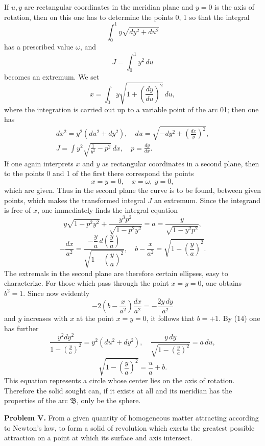 \documentclass[11pt,a4paper,leqno]{article}
\begin{document}
If $u,y$ are rectangular coordinates in the meridian plane and $y=0$ is the axis of rotation, then on this one has to determine the points 0, 1 so that the integral
\[
\int_0^1 y\sqrt{dy^2+du^2}
\]
has a prescribed value $\omega$, and
\[
J=\int_0^1 y^2\,du
\]
becomes an extremum. We set
\[
x=\int_0 y\sqrt{1+\left(\frac{dy}{du}\right)^2}\,du,
\]
where the integration is carried out up to a variable point of the arc 01; then one has
\begin{equation}\tag{14}
\begin{gathered}
dx^2=y^2(du^2+dy^2),\quad du=\sqrt{-dy^2+\left(\frac{dx}{y}\right)^2},\\
J=\int y^2\sqrt{\frac{1}{y^2}-p^2}\,dx,
\quad p=\frac{dy}{dx}.
\end{gathered}
\end{equation}
If one again interprets $x$ and $y$ as rectangular coordinates in a second plane, then to the points 0 and 1 of the first there correspond the points
\[
x=y=0,\quad x=\omega,\ y=0,
\]
which are given. Thus in the second plane the curve is to be found, between given points, which makes the transformed integral $J$ an extremum. Since the integrand is free of $x$, one immediately finds the integral equation
\[
y\sqrt{1-p^2y^2}+\frac{y^3p^2}{\sqrt{1-p^2y^2}}=a=\frac{y}{\sqrt{1-y^2p^2}},
\]
\[
-\frac{dx}{a^2}=\frac{-\dfrac{y}{a}\,d\left(\dfrac{y}{a}\right)}{\sqrt{1-\left(\dfrac{y}{a}\right)^2}},\quad
b-\frac{x}{a^2}=\sqrt{1-\left(\frac{y}{a}\right)^2}.
\]
The extremals in the second plane are therefore certain ellipses, easy to characterize. For those which pass through the point $x=y=0$, one obtains $b^2=1$. Since now evidently
\[
-2\left(b-\frac{x}{a^2}\right)\frac{dx}{a^2}=-\frac{2y\,dy}{a^2}
\]
and $y$ increases with $x$ at the point $x=y=0$, it follows that $b=+1$. By (14) one has further
\[
\frac{y^2dy^2}{1-\left(\frac{y}{a}\right)^2}=y^2(du^2+dy^2),\quad
\frac{y\,dy}{\sqrt{1-\left(\frac{y}{a}\right)^2}}=a\,du,
\]
\[
\sqrt{1-\left(\frac{y}{a}\right)^2}=\frac{u}{a}+b.
\]
This equation represents a circle whose center lies on the axis of rotation. Therefore the solid sought can, if it exists at all and its meridian has the properties of the arc $\mathfrak{B}$, only be the sphere.

\medskip
\noindent\textbf{Problem V.} From a given quantity of homogeneous matter attracting according to Newton's law, to form a solid of revolution which exerts the greatest possible attraction on a point at which its surface and axis intersect.
\end{document}
